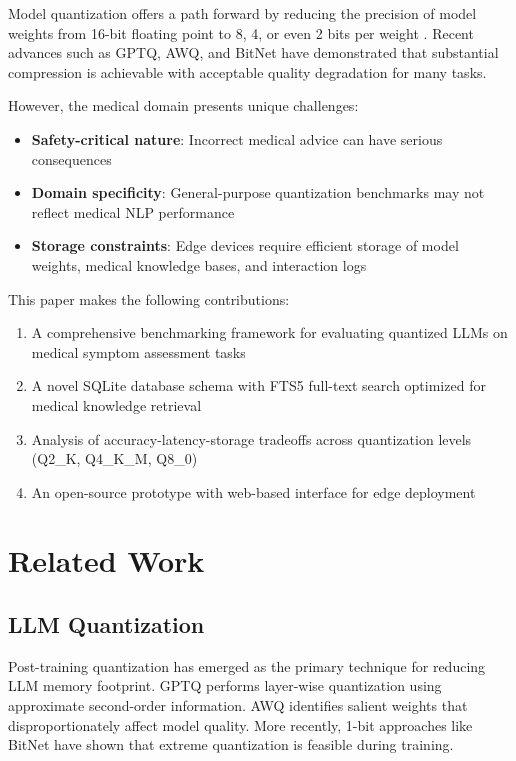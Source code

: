 \documentclass[conference]{IEEEtran}
\begin{document}
Model quantization offers a path forward by reducing the precision of model weights from 16-bit floating point to 8, 4, or even 2 bits per weight \cite{dettmers2022gpt3}. Recent advances such as GPTQ, AWQ, and BitNet have demonstrated that substantial compression is achievable with acceptable quality degradation for many tasks.

However, the medical domain presents unique challenges:
\begin{itemize}
    \item \textbf{Safety-critical nature}: Incorrect medical advice can have serious consequences
    \item \textbf{Domain specificity}: General-purpose quantization benchmarks may not reflect medical NLP performance
    \item \textbf{Storage constraints}: Edge devices require efficient storage of model weights, medical knowledge bases, and interaction logs
\end{itemize}

This paper makes the following contributions:
\begin{enumerate}
    \item A comprehensive benchmarking framework for evaluating quantized LLMs on medical symptom assessment tasks
    \item A novel SQLite database schema with FTS5 full-text search optimized for medical knowledge retrieval
    \item Analysis of accuracy-latency-storage tradeoffs across quantization levels (Q2\_K, Q4\_K\_M, Q8\_0)
    \item An open-source prototype with web-based interface for edge deployment
\end{enumerate}

\section{Related Work}

\subsection{LLM Quantization}

Post-training quantization has emerged as the primary technique for reducing LLM memory footprint. GPTQ \cite{frantar2022gptq} performs layer-wise quantization using approximate second-order information. AWQ \cite{lin2023awq} identifies salient weights that disproportionately affect model quality. More recently, 1-bit approaches like BitNet \cite{wang2023bitnet} have shown that extreme quantization is feasible during training.
\end{document}
